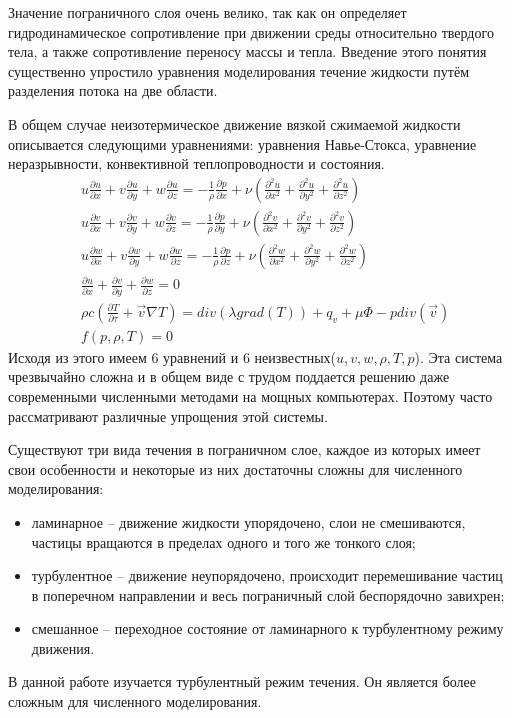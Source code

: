 	Значение пограничного слоя очень велико, так как он определяет гидродинамическое сопротивление при движении среды относительно твердого тела, а также сопротивление переносу массы и тепла. Введение этого понятия существенно упростило уравнения моделирования течение жидкости путём разделения потока на две области.
	
	В общем случае неизотермическое движение вязкой сжимаемой жидкости описывается следующими уравнениями: уравнения Навье-Стокса, уравнение неразрывности, конвективной теплопроводности и состояния.
	\begin{align}
		& u\frac{\partial u}{\partial x} + v\frac{\partial u}{\partial y} + w\frac{\partial u}{\partial z} = -\frac{1}{\rho}\frac{\partial p}{\partial x} + \nu(\frac{\partial^2 u}{\partial x^2} + \frac{\partial^2 u}{\partial y^2} + \frac{\partial^2 u}{\partial z^2}) \nonumber\\
		& u\frac{\partial v}{\partial x} + v\frac{\partial v}{\partial y} + w\frac{\partial v}{\partial z} = -\frac{1}{\rho}\frac{\partial p}{\partial y} + \nu(\frac{\partial^2 v}{\partial x^2} + \frac{\partial^2 v}{\partial y^2} + \frac{\partial^2 v}{\partial z^2})\nonumber\\
		& u\frac{\partial w}{\partial x} + v\frac{\partial w}{\partial y} + w\frac{\partial w}{\partial z} = -\frac{1}{\rho}\frac{\partial p}{\partial z} + \nu(\frac{\partial^2 w}{\partial x^2} + \frac{\partial^2 w}{\partial y^2} + \frac{\partial^2 w}{\partial z^2})\nonumber\\
		& \frac{\partial u}{\partial x} + \frac{\partial v}{\partial y} + \frac{\partial w}{\partial z} = 0 \nonumber\\
		& \rho c (\frac{\partial T}{\partial\tau} + \vec{v}\nabla T) = div(\lambda grad(T)) + q_v + \mu\Phi - p div(\vec{v}) \nonumber\\
		& f(p, \rho, T) = 0
	\end{align}
	Исходя из этого имеем 6 уравнений и 6 неизвестных($u, v, w, \rho, T, p$). Эта система чрезвычайно сложна и в общем виде с трудом поддается решению даже современными численными методами на мощных компьютерах. Поэтому часто рассматривают различные упрощения этой системы.
	
	Существуют три вида течения в пограничном слое, каждое из которых имеет свои особенности и некоторые из них достаточны сложны для численного моделирования:
	\begin{itemize}
		\item ламинарное -- движение жидкости упорядочено, слои не смешиваются, частицы вращаются в пределах одного и того же тонкого слоя;
		\item турбулентное -- движение неупорядочено, происходит перемешивание частиц в поперечном направлении и весь пограничный слой беспорядочно завихрен;
		\item смешанное -- переходное состояние от ламинарного к турбулентному режиму движения.
	\end{itemize}
	В данной работе изучается турбулентный режим течения. Он является более сложным для численного моделирования.

